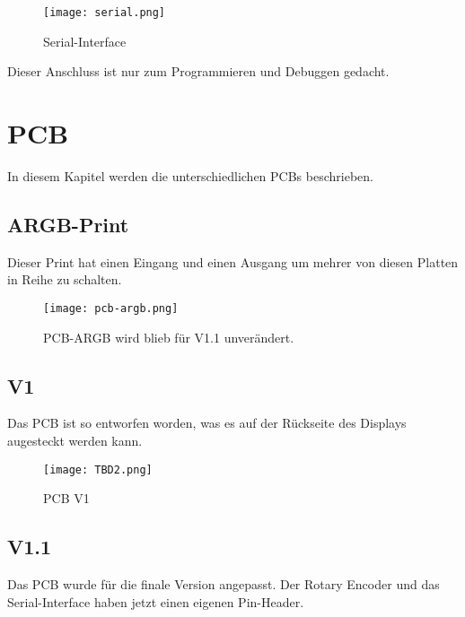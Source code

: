             \begin{figure}[h!]
                \centering
                \texttt{[image: serial.png]}
                \caption{Serial-Interface}
                \label{fig:sch9}

            \end{figure}
        
        Dieser Anschluss ist nur zum Programmieren und Debuggen gedacht.
    \newpage
    
    \section{PCB}

    In diesem Kapitel werden die unterschiedlichen PCBs beschrieben.


        \subsection{ARGB-Print}
        Dieser Print hat einen Eingang und einen Ausgang um mehrer von diesen 
        Platten in Reihe zu schalten.

        \begin{figure}[h!]
            \centering
            \texttt{[image: pcb-argb.png]}
            \caption{PCB-ARGB wird blieb für V1.1 unverändert.}
            \label{fig:pcbargb}

        \end{figure}

        \subsection{V1}

        Das PCB ist so entworfen worden, was es auf der Rückseite des Displays augesteckt 
        werden kann.

            \begin{figure}[h!]
                \centering
                \texttt{[image: TBD2.png]}
                \caption{PCB V1}
                \label{fig:pcb1}

            \end{figure}

        \newpage
        \subsection{V1.1}

        Das PCB wurde für die finale Version angepasst. Der Rotary Encoder und das Serial-Interface
        haben jetzt einen eigenen Pin-Header.

